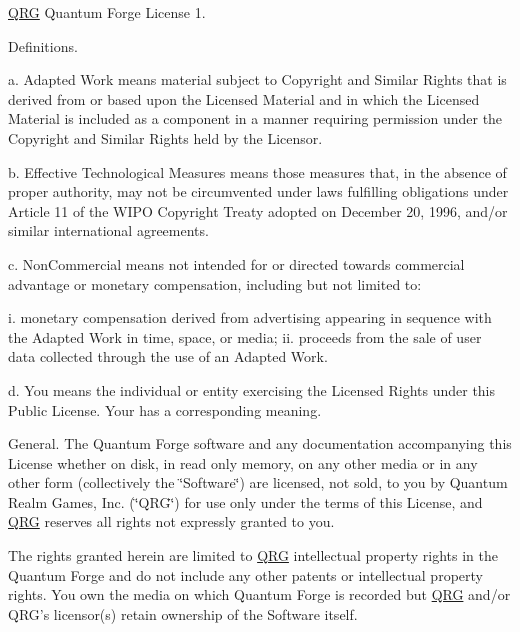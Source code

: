 \mbox{\hyperlink{namespace_q_r_g}{QRG}} Quantum Forge License 1.


\begin{DoxyEnumerate}
\item Definitions.
\end{DoxyEnumerate}

a. Adapted Work means material subject to Copyright and Similar Rights that is derived from or based upon the Licensed Material and in which the Licensed Material is included as a component in a manner requiring permission under the Copyright and Similar Rights held by the Licensor.

b. Effective Technological Measures means those measures that, in the absence of proper authority, may not be circumvented under laws fulfilling obligations under Article 11 of the WIPO Copyright Treaty adopted on December 20, 1996, and/or similar international agreements.

c. Non\+Commercial means not intended for or directed towards commercial advantage or monetary compensation, including but not limited to\+:

i. monetary compensation derived from advertising appearing in sequence with the Adapted Work in time, space, or media; ii. proceeds from the sale of user data collected through the use of an Adapted Work.

d. You means the individual or entity exercising the Licensed Rights under this Public License. Your has a corresponding meaning.


\begin{DoxyEnumerate}
\item General. The Quantum Forge software and any documentation accompanying this License whether on disk, in read only memory, on any other media or in any other form (collectively the \char`\"{}\+Software\char`\"{}) are licensed, not sold, to you by Quantum Realm Games, Inc. (\char`\"{}\+QRG\char`\"{}) for use only under the terms of this License, and \mbox{\hyperlink{namespace_q_r_g}{QRG}} reserves all rights not expressly granted to you.
\end{DoxyEnumerate}

The rights granted herein are limited to \mbox{\hyperlink{namespace_q_r_g}{QRG}} intellectual property rights in the Quantum Forge and do not include any other patents or intellectual property rights. You own the media on which Quantum Forge is recorded but \mbox{\hyperlink{namespace_q_r_g}{QRG}} and/or QRG’s licensor(s) retain ownership of the Software itself.


